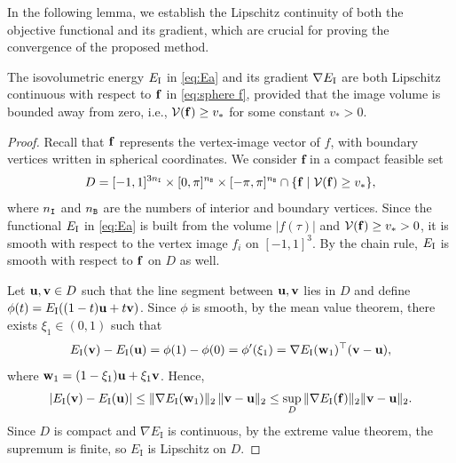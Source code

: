 \documentclass[11pt,a4paper]{article}
\begin{document}
In the following lemma, we establish the Lipschitz continuity of both the objective functional and its gradient, which are crucial for proving the convergence of the proposed method.


\begin{lemma}\label{lma:Lipschitz}
The isovolumetric energy $E_{\mathrm{I}}$ in \eqref{eq:Ea} and its gradient $\nabla E_{\mathrm{I}}$ are both Lipschitz continuous with respect to $\mathbf{f}$ in \eqref{eq:sphere f}, provided that the image volume is bounded away from zero, i.e., $\mathcal{V}(\mathbf{f})\geq v_*$ for some constant $v_*>0$.
\end{lemma}

\begin{proof}
Recall that $\mathbf{f}$ represents the vertex-image vector of $f$, with boundary vertices written in spherical coordinates. We consider \(\mathbf f\) in a compact feasible set 
$$
D = [-1,1]^{3 n_{\mathtt{I}}} \times [0, \pi]^{n_{\mathtt{B}}} \times [-\pi, \pi]^{n_{\mathtt{B}}} \cap \{ \mathbf{f} \mid \mathcal{V}(\mathbf{f}) \geq v_* \},
$$
where $n_{\mathtt{I}}$ and $n_{\mathtt{B}}$ are the numbers of interior and boundary vertices.
Since the functional $E_{\mathrm{I}}$ in \eqref{eq:Ea} is built from the volume $|f(\tau)|$ and $\mathcal{V}(\mathbf{f}) \geq v_* > 0$, it is smooth with respect to the vertex image $f_i$ on $[-1,1]^{3}$. By the chain rule, $E_{\mathrm{I}}$ is smooth with respect to $\mathbf{f}$ on $D$ as well.


Let $\mathbf{u},\mathbf{v}\in D$ such that the line segment between $\mathbf{u}, \mathbf{v}$ lies in $D$ and define $\phi(t) = E_{\mathrm{I}}((1-t)\mathbf{u} + t\mathbf{v})$. Since $\phi$ is smooth, by the mean value theorem, there exists $\xi_1 \in (0,1)$ such that 
\[
E_{\mathrm{I}}(\mathbf{v}) - E_{\mathrm{I}}(\mathbf{u}) = \phi(1) - \phi(0) = \phi'(\xi_1) = \nabla E_{\mathrm{I}}(\mathbf{w}_1)^\top (\mathbf{v} - \mathbf{u}),
\]
where $\mathbf{w}_1 = (1-\xi_1) \mathbf{u} + \xi_1 \mathbf{v}$. Hence,
\[
|E_{\mathrm{I}}(\mathbf{v}) - E_{\mathrm{I}}(\mathbf{u})| \leq \| \nabla E_{\mathrm{I}}(\mathbf{w}_1)\|_2\,  \|\mathbf{v} - \mathbf{u}\|_2 \leq \sup_D \|\nabla E_{\mathrm{I}}(\mathbf{f})\|_2 \|\mathbf{v} - \mathbf{u}\|_2.
\]
Since \(D\) is compact and \(\nabla E_{\mathrm I}\) is continuous, by the extreme value theorem, the supremum is finite, so \(E_{\mathrm I}\) is Lipschitz on \(D\).



\end{proof}
\end{document}
